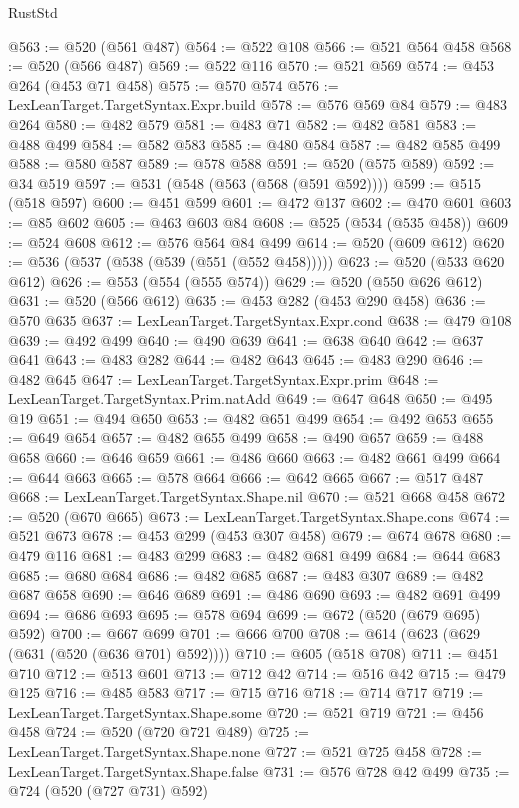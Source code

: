 \begin{lexlean}{RustStd}
\begin{coremodule}
@563 := @520 (@561 @487)
@564 := @522 @108
@566 := @521 @564 @458
@568 := @520 (@566 @487)
@569 := @522 @116
@570 := @521 @569
@574 := @453 @264 (@453 @71 @458)
@575 := @570 @574
@576 := LexLeanTarget.TargetSyntax.Expr.build
@578 := @576 @569 @84
@579 := @483 @264
@580 := @482 @579
@581 := @483 @71
@582 := @482 @581
@583 := @488 @499
@584 := @582 @583
@585 := @480 @584
@587 := @482 @585 @499
@588 := @580 @587
@589 := @578 @588
@591 := @520 (@575 @589)
@592 := @34 @519
@597 := @531 (@548 (@563 (@568 (@591 @592))))
@599 := @515 (@518 @597)
@600 := @451 @599
@601 := @472 @137
@602 := @470 @601
@603 := @85 @602
@605 := @463 @603 @84
@608 := @525 (@534 (@535 @458))
@609 := @524 @608
@612 := @576 @564 @84 @499
@614 := @520 (@609 @612)
@620 := @536 (@537 (@538 (@539 (@551 (@552 @458)))))
@623 := @520 (@533 @620 @612)
@626 := @553 (@554 (@555 @574))
@629 := @520 (@550 @626 @612)
@631 := @520 (@566 @612)
@635 := @453 @282 (@453 @290 @458)
@636 := @570 @635
@637 := LexLeanTarget.TargetSyntax.Expr.cond
@638 := @479 @108
@639 := @492 @499
@640 := @490 @639
@641 := @638 @640
@642 := @637 @641
@643 := @483 @282
@644 := @482 @643
@645 := @483 @290
@646 := @482 @645
@647 := LexLeanTarget.TargetSyntax.Expr.prim
@648 := LexLeanTarget.TargetSyntax.Prim.natAdd
@649 := @647 @648
@650 := @495 @19
@651 := @494 @650
@653 := @482 @651 @499
@654 := @492 @653
@655 := @649 @654
@657 := @482 @655 @499
@658 := @490 @657
@659 := @488 @658
@660 := @646 @659
@661 := @486 @660
@663 := @482 @661 @499
@664 := @644 @663
@665 := @578 @664
@666 := @642 @665
@667 := @517 @487
@668 := LexLeanTarget.TargetSyntax.Shape.nil
@670 := @521 @668 @458
@672 := @520 (@670 @665)
@673 := LexLeanTarget.TargetSyntax.Shape.cons
@674 := @521 @673
@678 := @453 @299 (@453 @307 @458)
@679 := @674 @678
@680 := @479 @116
@681 := @483 @299
@683 := @482 @681 @499
@684 := @644 @683
@685 := @680 @684
@686 := @482 @685
@687 := @483 @307
@689 := @482 @687 @658
@690 := @646 @689
@691 := @486 @690
@693 := @482 @691 @499
@694 := @686 @693
@695 := @578 @694
@699 := @672 (@520 (@679 @695) @592)
@700 := @667 @699
@701 := @666 @700
@708 := @614 (@623 (@629 (@631 (@520 (@636 @701) @592))))
@710 := @605 (@518 @708)
@711 := @451 @710
@712 := @513 @601
@713 := @712 @42
@714 := @516 @42
@715 := @479 @125
@716 := @485 @583
@717 := @715 @716
@718 := @714 @717
@719 := LexLeanTarget.TargetSyntax.Shape.some
@720 := @521 @719
@721 := @456 @458
@724 := @520 (@720 @721 @489)
@725 := LexLeanTarget.TargetSyntax.Shape.none
@727 := @521 @725 @458
@728 := LexLeanTarget.TargetSyntax.Shape.false
@731 := @576 @728 @42 @499
@735 := @724 (@520 (@727 @731) @592)

\end{coremodule}
\end{lexlean}
